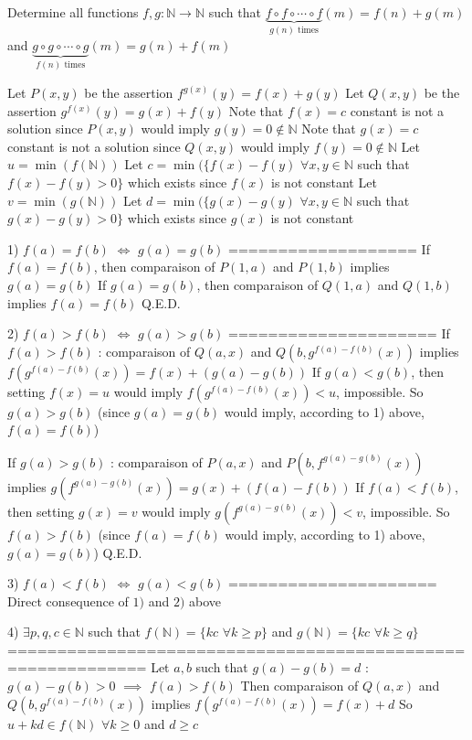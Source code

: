 \begin{solution}
	\begin{tcolorbox}Determine all functions $ f,g:\mathbb{N}\to\mathbb{N} $ such that $ \underbrace{f{\circ}f{\circ}\cdots{\circ}f}_{g(n)\textrm{ times}}(m)=f(n)+g(m) $ and  $ \underbrace{g{\circ}g{\circ}\cdots{\circ}g}_{f(n)\textrm{ times}}(m)=g(n)+f(m) $\end{tcolorbox}

Let $P(x,y)$ be the assertion $f^{g(x)}(y)=f(x)+g(y)$
Let $Q(x,y)$ be the assertion $g^{f(x)}(y)=g(x)+f(y)$
Note that $f(x)=c$ constant is not a solution since $P(x,y)$ would imply $g(y)=0\notin \mathbb N$
Note that $g(x)=c$ constant is not a solution since $Q(x,y)$ would imply $f(y)=0\notin \mathbb N$
Let $u=\min(f(\mathbb N))$
Let $c=\min(\{f(x)-f(y)$ $\forall x,y\in\mathbb N$ such that $f(x)-f(y)>0\}$ which exists since $f(x)$ is not constant
Let $v=\min(g(\mathbb N))$
Let $d=\min(\{g(x)-g(y)$ $\forall x,y\in\mathbb N$ such that $g(x)-g(y)>0\}$ which exists since $g(x)$ is not constant

1) $f(a)=f(b)$ $\iff$ $g(a)=g(b)$
===================
If $f(a)=f(b)$, then comparaison of $P(1,a)$ and $P(1,b)$ implies $g(a)=g(b)$
If $g(a)=g(b)$, then comparaison of $Q(1,a)$ and $Q(1,b)$ implies $f(a)=f(b)$
Q.E.D.

2) $f(a)>f(b)$ $\iff$ $g(a)>g(b)$
=====================
If $f(a)>f(b)$ : comparaison of $Q(a,x)$ and $Q(b,g^{f(a)-f(b)}(x))$ implies $f(g^{f(a)-f(b)}(x))=f(x)+(g(a)-g(b))$
If $g(a)<g(b)$, then setting $f(x)=u$ would imply $f(g^{f(a)-f(b)}(x))<u$, impossible.
So $g(a)>g(b)$ (since $g(a)=g(b)$ would imply, according to 1) above, $f(a)=f(b)$)

If $g(a)>g(b)$ : comparaison of $P(a,x)$ and $P(b,f^{g(a)-g(b)}(x))$ implies $g(f^{g(a)-g(b)}(x))=g(x)+(f(a)-f(b))$
If $f(a)<f(b)$, then setting $g(x)=v$ would imply $g(f^{g(a)-g(b)}(x))<v$, impossible.
So $f(a)>f(b)$ (since $f(a)=f(b)$ would imply, according to 1) above, $g(a)=g(b)$)
Q.E.D.

3) $f(a)<f(b)$ $\iff$ $g(a)<g(b)$
=====================
Direct consequence of $1)$ and $2)$ above

4) $\exists p,q,c\in\mathbb N$ such that $f(\mathbb N)=\{kc$ $\forall k\ge p\}$ and $g(\mathbb N)=\{kc$ $\forall k\ge q\}$
============================================================
Let $a,b$ such that $g(a)-g(b)=d$ : 
$g(a)-g(b)>0$ $\implies$ $f(a)>f(b)$
Then comparaison of $Q(a,x)$ and $Q(b,g^{f(a)-f(b)}(x))$ implies $f(g^{f(a)-f(b)}(x))=f(x)+d$
So $u+kd\in f(\mathbb N)$ $\forall k\ge 0$ and $d\ge c$


\end{solution}
